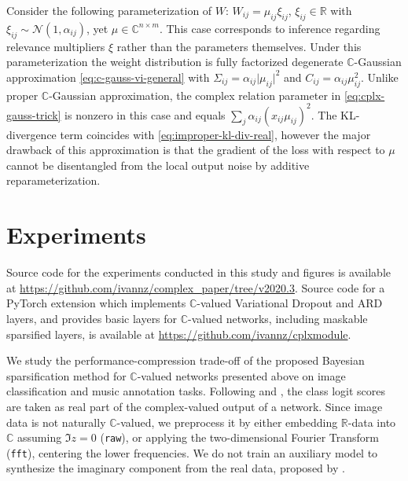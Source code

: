 \documentclass[a4paper,10pt,twocolumn]{article}
\newcommand{\real}{\mathbb{R}}
\newcommand{\cplx}{\mathbb{C}}
\begin{document}
Consider the following parameterization of $W$: $
  W_{ij} = \mu_{ij} \xi_{ij}
$, $\xi_{ij} \in \real$ with $
  \xi_{ij} \sim \mathcal{N}(1, \alpha_{ij})
$, yet $\mu \in \cplx^{n \times m}$. This case corresponds to inference regarding
relevance multipliers $\xi$ rather than the parameters themselves. Under this parameterization
the weight distribution is fully factorized degenerate $\cplx$-Gaussian approximation
\eqref{eq:c-gauss-vi-general} with $
  \Sigma_{ij} = \alpha_{ij} \lvert \mu_{ij} \rvert^2
$ and $
  C_{ij} = \alpha_{ij} \mu_{ij}^2
$. Unlike proper $\cplx$-Gaussian approximation, the complex relation parameter in
\eqref{eq:cplx-gauss-trick} is nonzero in this case and equals $
  \sum_j \alpha_{ij} (x_{ij} \mu_{ij})^2
$.
%
The KL-divergence term coincides with \eqref{eq:improper-kl-div-real}, however the major
drawback of this approximation is that the gradient of the loss with respect to $\mu$ cannot
be disentangled from the local output noise by additive reparameterization.





\section{Experiments} %
\label{sec:experiments}

Source code for the experiments conducted in this study and figures is available at
\url{https://github.com/ivannz/complex_paper/tree/v2020.3}.
%
Source code for a PyTorch extension which implements $\cplx$-valued Variational Dropout and
ARD layers, and provides basic layers for $\cplx$-valued networks, including maskable
sparsified layers, is available at
\url{https://github.com/ivannz/cplxmodule}.
\smallskip

We study the performance-compression trade-off of the proposed Bayesian sparsification
method for $\cplx$-valued networks presented above on image classification and music
annotation tasks.
%
Following \citet{wolter_complex_2018} and \citet{trabelsi_deep_2018}, the class logit scores
are taken as real part of the complex-valued output of a network.
%
Since image data is not naturally $\cplx$-valued, we preprocess it by either embedding
$\real$-data into $\cplx$ assuming $\Im z = 0$ (\texttt{raw}), or applying the two-dimensional
Fourier Transform (\texttt{fft}), centering the lower frequencies. We do not train an
auxiliary model to synthesize the imaginary component from the real data, proposed by
\citet{trabelsi_deep_2018}.
\end{document}
